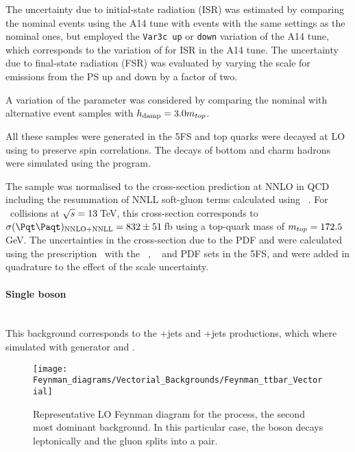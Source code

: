 The uncertainty due to initial-state radiation (ISR) was estimated 
by comparing the nominal \ttbar events using the A14 tune with \ttbar events with the same 
settings as the nominal ones, but employed the \texttt{Var3c up} or \texttt{down} variation 
of the A14 tune, which corresponds to the variation of \alphas for ISR in the A14 
tune\cite{ATL-PHYS-PUB-2014-021}. The uncertainty due to final-state radiation (FSR) 
was evaluated by varying the \muR scale for emissions from the PS up and down by a 
factor of two.

A variation of the \hdamp parameter was considered by comparing the nominal with 
alternative event samples with $h_\mathrm{damp} = 3.0m_{top}$.

All these samples were generated in the 5FS and top quarks were decayed at LO using 
\MADSPIN \cite{Frixione:2007zp,Artoisenet:2012st} to preserve spin correlations. The 
decays of bottom and charm hadrons were simulated using the \EVTGEN[1.6.0] program.

The \ttbar sample was normalised to the cross-section prediction at NNLO
in QCD including the resummation of NNLL soft-gluon terms calculated using
\TOPpp[2.0]~\cite{Beneke:2011mq,Cacciari:2011hy,Baernreuther:2012ws,Czakon:2012zr,Czakon:2012pz,Czakon:2013goa,Czakon:2011xx}.
For \pp\ collisions at \(\sqrt{s} = 13\,\)TeV, this cross-section corresponds to
\(\sigma(\ttbar)_{\text{NNLO+NNLL}} = 832 \pm 51\,\)fb using a top-quark mass of \(m_{top} = 172.5\,\)GeV.
The uncertainties in the cross-section due to the PDF and \alphas were calculated using 
the \PDFforLHC[15] prescription~\cite{Butterworth:2015oua}
with the \MSTW[nnlo]~\cite{Martin:2009iq,Martin:2009bu}, 
\CT[10nnlo]~\cite{Lai:2010vv,Gao:2013xoa}
and \NNPDF[2.3lo] PDF sets in the 5FS, and were
added in quadrature to the effect of the scale uncertainty.


\paragraph{Single boson}\mbox{}\\
This background corresponds to the \PZ+jets and \PW+jets productions, which where
 simulated with \Sherpa generator and \NNLO. 
 
 
 \begin{figure}[htbp!]
\centering
\texttt{[image: Feynman\_diagrams/Vectorial\_Backgrounds/Feynman\_ttbar\_Vectorial]}
\caption{Representative LO Feynman diagram for the \Zjets process, the second most dominant background. In this particular case, the \PZ boson decays leptonically and
the gluon splits into a \bbbar pair.}
\label{fig:tHq:Backgrounds:Feynman_Zjets}
\end{figure}
 

